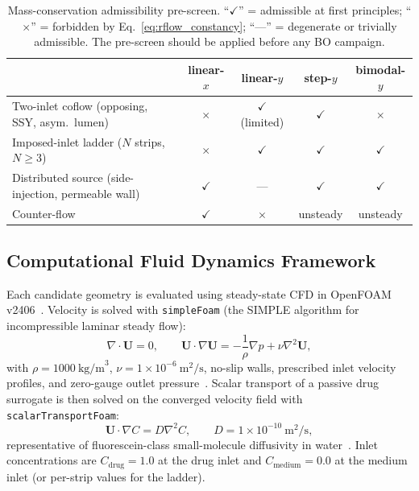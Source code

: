 \documentclass[12pt]{article}
\begin{document}
\begin{table}[htbp]
\centering
\caption{Mass-conservation admissibility pre-screen. ``$\checkmark$'' = admissible at first principles; ``$\times$'' = forbidden by Eq.~\ref{eq:rflow_constancy}; ``---'' = degenerate or trivially admissible. The pre-screen should be applied before any BO campaign.}
\label{tab:admissibility}
\begin{tabular}{l c c c c}
\toprule
& \textbf{linear-$x$} & \textbf{linear-$y$} & \textbf{step-$y$} & \textbf{bimodal-$y$} \\
\midrule
Two-inlet coflow (opposing, SSY, asym.\ lumen) & $\times$ & $\checkmark$ (limited) & $\checkmark$ & $\times$ \\
Imposed-inlet ladder ($N$ strips, $N \geq 3$)   & $\times$ & $\checkmark$ & $\checkmark$ & $\checkmark$ \\
Distributed source (side-injection, permeable wall) & $\checkmark$ & --- & $\checkmark$ & $\checkmark$ \\
Counter-flow                                    & $\checkmark$ & $\times$ & unsteady & unsteady \\
\bottomrule
\end{tabular}
\end{table}

\subsection{Computational Fluid Dynamics Framework}
Each candidate geometry is evaluated using steady-state CFD in OpenFOAM v2406~\cite{weller1998tensorial,jasak2009openfoam}. Velocity is solved with \texttt{simpleFoam} (the SIMPLE algorithm for incompressible laminar steady flow):
\begin{equation}
\nabla \cdot \mathbf{U} = 0, \qquad \mathbf{U} \cdot \nabla \mathbf{U} = -\frac{1}{\rho} \nabla p + \nu \nabla^2 \mathbf{U},
\end{equation}
with $\rho = 1000~\text{kg/m}^3$, $\nu = 1\times 10^{-6}~\text{m}^2/\text{s}$, no-slip walls, prescribed inlet velocity profiles, and zero-gauge outlet pressure~\cite{ferziger2012}. Scalar transport of a passive drug surrogate is then solved on the converged velocity field with \texttt{scalarTransportFoam}:
\begin{equation}
\mathbf{U} \cdot \nabla C = D \nabla^2 C, \qquad D = 1\times 10^{-10}~\text{m}^2/\text{s},
\end{equation}
representative of fluorescein-class small-molecule diffusivity in water~\cite{chenyakin2017diffusion}. Inlet concentrations are $C_{\text{drug}} = 1.0$ at the drug inlet and $C_{\text{medium}} = 0.0$ at the medium inlet (or per-strip values for the ladder).
\end{document}
